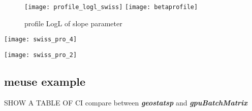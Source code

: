 \documentclass{article}\usepackage[]{graphicx}\usepackage[]{color}
\newenvironment{knitrout}{}{} %
\newcommand{\pkg}[1]{\textbf{\emph{#1}}}
\begin{document}
\begin{knitrout}
\color{fgcolor}\begin{figure}[H]

{\centering \texttt{[image: profile\_logl\_swiss]} 
\texttt{[image: betaprofile]} 

}

\caption[profile LogL of slope parameter]{profile LogL of slope parameter}\label{fig:swiss_profile_many}
\end{figure}

\end{knitrout}

\begin{knitrout}
\color{fgcolor}

{\centering \texttt{[image: swiss\_pro\_4]} 

}




{\centering \texttt{[image: swiss\_pro\_2]} 

}


\end{knitrout}






\subsection{meuse example}


SHOW A TABLE OF CI compare between \pkg{geostatsp} and \pkg{gpuBatchMatrix}
\end{document}
